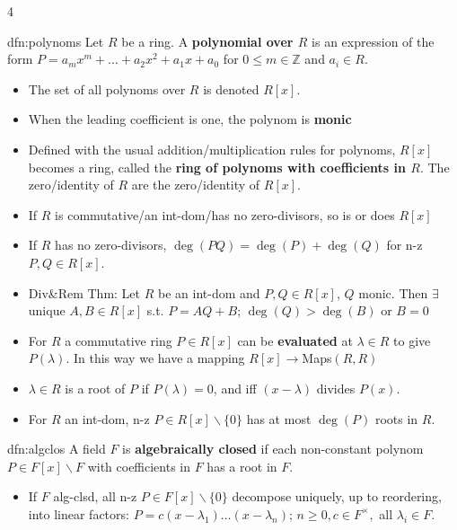 \documentclass[landscape, 8pt]{extarticle}
\begin{document}
\begin{multicols*}{4}
		
		\begin{dfn}[Polynomials]{dfn:polynoms}{ }
			Let $R$ be a ring. A \textbf{polynomial over $R$} is an expression of the form $P = a_m x^m + \dots + a_2 x^2 + a_1 x + a_0$ for $0 \le m \in \mathbb{Z}$ and $a_i \in R$.
			\begin{itemize}
				\item The set of all polynoms over $R$ is denoted $R[x]$.
				\item When the leading coefficient is one, the polynom is \textbf{monic}
				\item Defined with the usual addition/multiplication rules for polynoms, $R[x]$ becomes a ring, called the \textbf{ring of polynoms with coefficients in $R$}. The zero/identity of $R$ are the zero/identity of $R[x]$.
				\item If $R$ is commutative/an int-dom/has no zero-divisors, so is or does $R[x]$
				\item If $R$ has no zero-divisors, $\deg(PQ) = \deg(P) + \deg(Q)$ for n-z $P, Q \in R[x]$.
				\item Div\&Rem Thm: Let $R$ be an int-dom and $P, Q \in R[x]$, $Q$ monic. Then $\exists$ unique $A, B \in R[x]$ s.t. $P = AQ + B$; $\deg (Q) > \deg (B)$ or $B=0$
				\item For $R$ a commutative ring $P \in R[x]$ can be \textbf{evaluated} at $\lambda \in R$ to give $P(\lambda)$. In this way we have a mapping $R[x] \to $Maps$(R, R)$
				\item $\lambda \in R$ is a root of $P$ if $P(\lambda) = 0$, and iff $(x - \lambda)$ divides $P(x)$.
				\item For $R$ an int-dom, n-z $P \in R[x] \backslash \{0\}$ has at most $\deg (P)$ roots in $R$.
			\end{itemize}
			
		\end{dfn}
		
		
		\begin{dfn}{dfn:algclos}{ }
			A field $F$ is \textbf{algebraically closed} if each non-constant polynom $P \in F[x] \backslash F$ with coefficients in $F$ has a root in $F$.\\
			\begin{itemize}
				\item If $F$ alg-clsd, all n-z $P \in F[x] \backslash \{0\}$ decompose uniquely, up to reordering, into linear factors: $P = c(x-\lambda_1)\dots(x-\lambda_n)$; $n \ge 0, c \in F^\times,$ all $\lambda_i \in F$.
			\end{itemize}
			

\end{dfn}
\end{multicols*}
\end{document}
